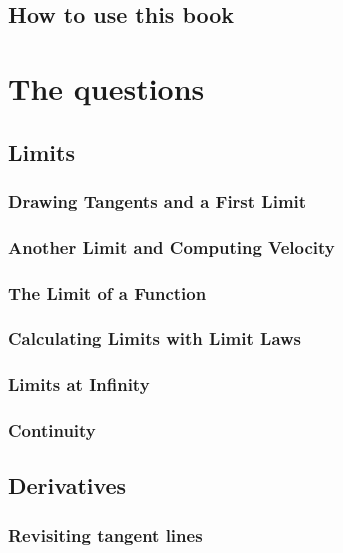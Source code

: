 \documentclass[12pt,letterpaper]{book}
\begin{document}
\chapter{How to use this book}


\tableofcontents

\mainmatter


\part{The questions}

\chapter{Limits}
\section{Drawing Tangents and a First Limit}

\section{Another Limit and Computing Velocity}

\section{The Limit of a Function}

\section{Calculating Limits with Limit Laws}

\section{Limits at Infinity}

\section{Continuity}


\chapter{Derivatives}
\section{Revisiting tangent lines}

\end{document}

